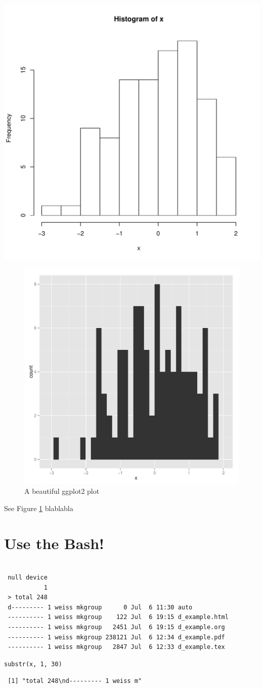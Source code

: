 \documentclass[11pt]{article}
\begin{document}
\includegraphics[width=.9\linewidth]{../fig/f_pub_histogram.pdf}





\begin{figure}[htb]
\centering
\includegraphics[width = 0.2\linewidth, clip]{../fig/f_pub_histogram_gg.pdf}
\caption{\label{f:ggplot}A beautiful ggplot2 plot}
\end{figure}

See Figure \ref{f:ggplot} blablabla
\section{Use the Bash!}
\label{sec-3}




\begin{verbatim}
 
 null device 
           1
 > total 248
 d--------- 1 weiss mkgroup      0 Jul  6 11:30 auto
 ---------- 1 weiss mkgroup    122 Jul  6 19:15 d_example.html
 ---------- 1 weiss mkgroup   2451 Jul  6 19:15 d_example.org
 ---------- 1 weiss mkgroup 238121 Jul  6 12:34 d_example.pdf
 ---------- 1 weiss mkgroup   2847 Jul  6 12:33 d_example.tex
\end{verbatim}



\lstset{language=R}
\begin{lstlisting}
substr(x, 1, 30)
\end{lstlisting}

\begin{verbatim}
 [1] "total 248\nd--------- 1 weiss m"
\end{verbatim}
\end{document}
